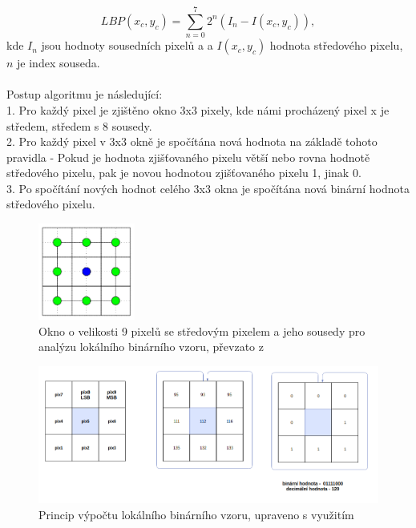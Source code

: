 $$LBP(x_c,y_c) = \sum_{n=0}^{7}2^n(I_n-I(x_c,y_c)),$$
kde $I_n$ jsou hodnoty sousedních pixelů a a $I(x_c,y_c)$ hodnota středového pixelu, $n$ je index souseda.\\\\
Postup algoritmu je následující:\\
1. Pro každý pixel je zjištěno okno 3x3 pixely, kde námi procházený pixel x je středem, středem s 8 sousedy.\\
2. Pro každý pixel v 3x3 okně je spočítána nová hodnota na základě tohoto pravidla - Pokud je hodnota zjišťovaného pixelu větší nebo rovna hodnotě středového pixelu, pak je novou hodnotou zjišťovaného pixelu 1, jinak 0.\\
3. Po spočítání nových hodnot celého 3x3 okna je spočítána nová binární hodnota středového pixelu.\\

\begin{figure}[htbp]
    \centering
    \includegraphics[width=120]{obrazky-figures/lbpn.png}
    \caption{Okno o velikosti 9 pixelů se středovým pixelem a jeho sousedy pro analýzu lokálního binárního vzoru, převzato z \cite{GragnanielloStudy}}
    \label{fig:localne}
\end{figure}

\begin{figure}[htbp]
    \centering
    \includegraphics[width=460]{obrazky-figures/lbpprincip.png}
    \caption{Princip výpočtu lokálního binárního vzoru, upraveno s využitím \cite{GaikwadStudy}}
    \label{fig:lbpprincip}
\end{figure}

